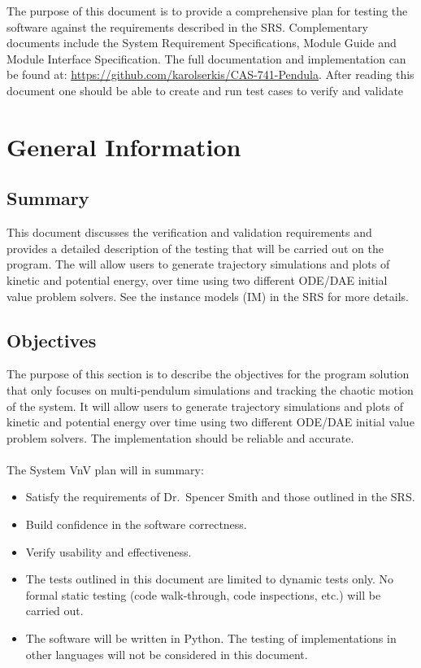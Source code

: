 \documentclass[12pt, titlepage]{article}
\begin{document}

The purpose of this document is to provide a comprehensive plan for testing the 
\progname software against the requirements described in the
\progname SRS. 
Complementary documents include the System Requirement Specifications, Module
Guide and Module Interface Specification.  The full documentation and
implementation can be found at:
\url{https://github.com/karolserkis/CAS-741-Pendula}. 
After reading this document one should be able to create and run test cases to 
verify and validate \progname
{}

\section{General Information}

\subsection{Summary}

This document discusses the verification and validation requirements and
provides a detailed description of the testing that will be carried out on the
\progname  program.
The \progname will allow users to generate trajectory simulations and 
plots of kinetic and potential energy, over time using two different ODE/DAE initial value
problem solvers. See the instance models (IM) in the SRS for more details.


\subsection{Objectives}
The purpose of this section is to describe the objectives for the
\progname program solution that
only focuses on multi-pendulum simulations and tracking the chaotic
motion of the system. It will allow users to generate trajectory simulations
and plots of kinetic and potential energy over time using two different ODE/DAE initial 
value problem solvers. The implementation should be reliable and accurate.\\\\
The System VnV plan will in summary:
\begin{itemize}
\item Satisfy the requirements of Dr.\ Spencer Smith and those
  outlined in the SRS.
\item Build confidence in the software correctness.
\item Verify usability and effectiveness.
\item The tests outlined in this document are limited to dynamic tests only.  
No formal static testing (code walk-through, code inspections, etc.) will be 
carried out.
\item The \progname software will be written in Python. The testing of 
implementations in other languages will not be considered in this document.
\end{itemize}
\end{document}
